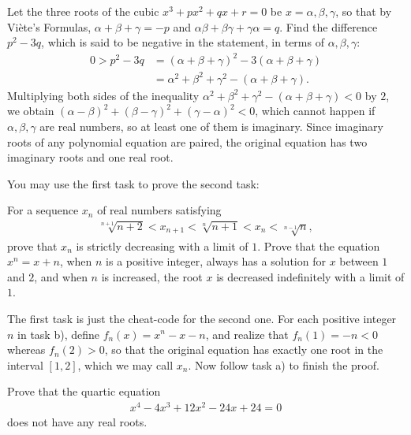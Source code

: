 \begin{solution}
    Let the three roots of the cubic $x^3+px^2+qx+r=0$ be $x=\alpha, \beta, \gamma$, so that by Viète's Formulas, $\alpha+\beta+\gamma=-p$ and $\alpha\beta+\beta\gamma+\gamma\alpha=q$. Find the difference $p^2-3q$, which is said to be negative in the statement, in terms of $\alpha,\beta,\gamma$:
    \begin{align*}
        0 > p^2 - 3q &= (\alpha+\beta+\gamma)^2 - 3(\alpha+\beta+\gamma)\\
        &= \alpha^2+\beta^2+\gamma^2-(\alpha+\beta+\gamma).
    \end{align*}
    Multiplying both sides of the inequality $\alpha^2+\beta^2+\gamma^2-(\alpha+\beta+\gamma) < 0$ by $2$, we obtain $(\alpha-\beta)^2+(\beta-\gamma)^2+(\gamma-\alpha)^2 < 0$, which cannot happen if $\alpha,\beta,\gamma$ are real numbers, so at least one of them is imaginary. Since imaginary roots of any polynomial equation are paired, the original equation has two imaginary roots and one real root.
\end{solution}

\begin{question}
    You may use the first task to prove the second task:
    \begin{tasks}
        \task For a sequence $x_n$ of real numbers satisfying
        \begin{align*}
            \sqrt[n+1]{n+2} < x_{n+1} < \sqrt[n]{n+1} < x_n < \sqrt[n-1]{n},
        \end{align*}
        prove that $x_n$ is strictly decreasing with a limit of $1$.
        \task Prove that the equation $x^n=x+n$, when $n$ is a positive integer, always has a solution for $x$ between $1$ and $2$, and when $n$ is increased, the root $x$ is decreased indefinitely with a limit of $1$.
    \end{tasks}
\end{question}

\begin{solution}
    The first task is just the cheat-code for the second one. For each positive integer $n$ in task b), define $f_n(x)=x^n-x-n$, and realize that $f_n(1)=-n<0$ whereas $f_n(2)>0$, so that the original equation has exactly one root in the interval $[1,2]$, which we may call $x_n$. Now follow task a) to finish the proof.
\end{solution}

\begin{question}
    Prove that the quartic equation
    \begin{align*}
        x^4-4x^3+12x^2-24x+24=0
    \end{align*}
    does not have any real roots.
\end{question}

